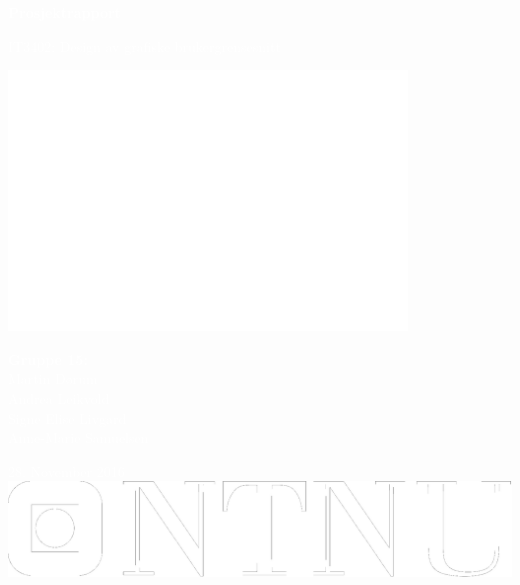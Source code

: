 \documentclass{article}
\begin{document}
\begin{center}
\vspace*{3.5cm}
{\fontsize{50}{100}\textbf{{\textcolor{white}{Prosjektrapport}}}}
\vspace{0.5cm}

\Large{\textcolor{white}{IT3402: Design av grafiske brukergrensesnitt}}\\[1pc]
\vspace{1.5cm}

\includegraphics[scale=0.35]{images/sirkus2.png}
\vspace{1.5cm}

\large{{\textbf{\textcolor{white}{Gruppe 15:}} \\
\textcolor{white}{Martin Dørum\\
Andrea Leikvold\\
Signe Elise Livgard\\
Anne-Marie Samuelsen}\\
}}
\vspace{2.5cm}

\large{\textcolor{white}{28. November 2016}}\\
\vspace{1.0cm}
\includegraphics[scale=0.15]{images/ntnu2.png}
\end{center}
\end{document}
